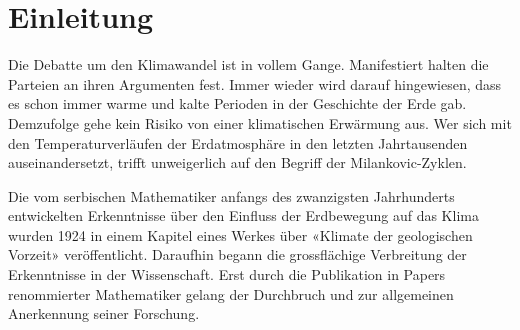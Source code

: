 %
%
%
%
\section{Einleitung\label{milankovic:section:Einleitung}}

Die Debatte um den Klimawandel ist in vollem Gange.
Manifestiert halten die Parteien an ihren Argumenten fest.
Immer wieder wird darauf hingewiesen, dass es schon immer warme und kalte Perioden in der Geschichte der Erde gab.
Demzufolge gehe kein Risiko von einer klimatischen Erwärmung aus.
Wer sich mit den Temperaturverläufen der Erdatmosphäre in den letzten Jahrtausenden auseinandersetzt, trifft unweigerlich auf den Begriff der Milankovic-Zyklen.

Die vom serbischen Mathematiker anfangs des zwanzigsten Jahrhunderts entwickelten Erkenntnisse über den Einfluss der Erdbewegung auf das Klima wurden 1924 in einem Kapitel eines Werkes über «Klimate der geologischen Vorzeit» veröffentlicht.
Daraufhin begann die grossflächige Verbreitung der Erkenntnisse in der Wissenschaft. Erst durch die Publikation in Papers renommierter Mathematiker gelang der Durchbruch und zur allgemeinen Anerkennung seiner Forschung.


